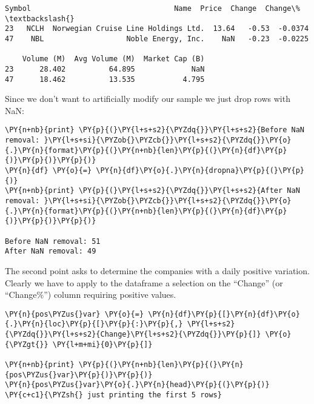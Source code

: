 \begin{Answer}
\begin{tcolorbox}[size=fbox, boxrule=1pt, colback=cellbackground, colframe=cellborder]
\begin{Verbatim}[commandchars=\\\{\}]
   Symbol                                 Name  Price  Change  Change\%  \textbackslash{}
23   NCLH  Norwegian Cruise Line Holdings Ltd.  13.64   -0.53  -0.0374
47    NBL                   Noble Energy, Inc.    NaN   -0.23  -0.0225

    Volume (M)  Avg Volume (M)  Market Cap (B)
23      28.402          64.895             NaN
47      18.462          13.535           4.795
\end{Verbatim}
\end{tcolorbox}
        
Since we don't want to artificially modify our sample we just drop rows with NaN:

\begin{tcolorbox}[size=fbox, boxrule=1pt, colback=cellbackground, colframe=cellborder]
\begin{Verbatim}[commandchars=\\\{\}]
\PY{n+nb}{print} \PY{p}{(}\PY{l+s+s2}{\PYZdq{}}\PY{l+s+s2}{Before NaN removal: }\PY{l+s+si}{\PYZob{}\PYZcb{}}\PY{l+s+s2}{\PYZdq{}}\PY{o}{.}\PY{n}{format}\PY{p}{(}\PY{n+nb}{len}\PY{p}{(}\PY{n}{df}\PY{p}{)}\PY{p}{)}\PY{p}{)}
\PY{n}{df} \PY{o}{=} \PY{n}{df}\PY{o}{.}\PY{n}{dropna}\PY{p}{(}\PY{p}{)}
\PY{n+nb}{print} \PY{p}{(}\PY{l+s+s2}{\PYZdq{}}\PY{l+s+s2}{After NaN removal: }\PY{l+s+si}{\PYZob{}\PYZcb{}}\PY{l+s+s2}{\PYZdq{}}\PY{o}{.}\PY{n}{format}\PY{p}{(}\PY{n+nb}{len}\PY{p}{(}\PY{n}{df}\PY{p}{)}\PY{p}{)}\PY{p}{)}

Before NaN removal: 51
After NaN removal: 49
\end{Verbatim}
\end{tcolorbox}

\Question
The second point asks to determine the companies with a daily positive variation. Clearly we have to apply to the dataframe a selection on the ``Change'' (or ``Change\%'') column requiring positive values.

\begin{tcolorbox}[size=fbox, boxrule=1pt, colback=cellbackground, colframe=cellborder]
\begin{Verbatim}[commandchars=\\\{\}]
\PY{n}{pos\PYZus{}var} \PY{o}{=} \PY{n}{df}\PY{p}{[}\PY{n}{df}\PY{o}{.}\PY{n}{loc}\PY{p}{[}\PY{p}{:}\PY{p}{,} \PY{l+s+s2}{\PYZdq{}}\PY{l+s+s2}{Change}\PY{l+s+s2}{\PYZdq{}}\PY{p}{]} \PY{o}{\PYZgt{}} \PY{l+m+mi}{0}\PY{p}{]}

\PY{n+nb}{print} \PY{p}{(}\PY{n+nb}{len}\PY{p}{(}\PY{n}{pos\PYZus{}var}\PY{p}{)}\PY{p}{)}
\PY{n}{pos\PYZus{}var}\PY{o}{.}\PY{n}{head}\PY{p}{(}\PY{p}{)} \PY{c+c1}{\PYZsh{} just printing the first 5 rows}


\end{Verbatim}
\end{tcolorbox}
\end{Answer}
